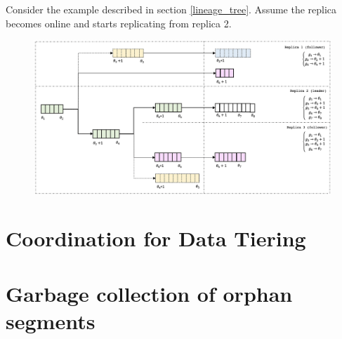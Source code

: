 \documentclass{article}
\begin{document}
Consider the example described in section \ref{lineage_tree}. Assume the replica becomes online and starts replicating from replica 2.

\begin{figure}[H]
	\centering
	\includegraphics[scale=0.45]{lineage-tree-2.png}
	\label{fig:lineage-tree-2}
\end{figure}



\newpage
\section{Coordination for Data Tiering}

\newpage
\section{Garbage collection of orphan segments}

\newpage

{}
\end{document}

